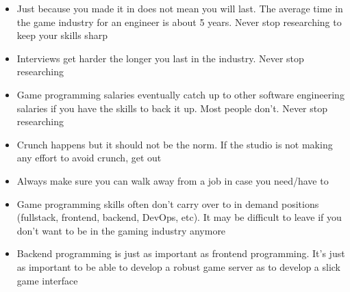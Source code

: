 \documentclass[12pt]{article}
\begin{document}
\begin{itemize}
\item Just because you made it in does not mean you will last.  The average time in the game industry for an engineer is about 5 years.  Never stop researching to keep your skills sharp
\item Interviews get harder the longer you last in the industry.  Never stop researching
\item Game programming salaries eventually catch up to other software engineering salaries if you have the skills to back it up.  Most people don't.  Never stop researching
\item Crunch happens but it should not be the norm.  If the studio is not making any effort to avoid crunch, get out 
\item Always make sure you can walk away from a job in case you need/have to
\item Game programming skills often don't carry over to in demand positions (fullstack, frontend, backend, DevOps, etc).  It may be difficult to leave if you don't want to be in the gaming industry anymore
\item Backend programming is just as important as frontend programming.  It's just as important to be able to develop a robust game server as to develop a slick game interface
\end{itemize}
\end{document}
